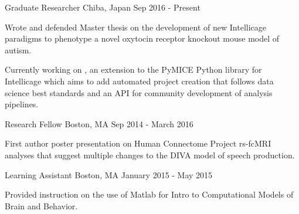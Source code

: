 \vspace*{0.35cm}

\begin{cventries}

    {Graduate Researcher}
    {Chiba, Japan}
    {Sep 2016 - Present}
    {\begin{cvitems}
        \item{
            {Wrote} and 
            {defended} Master thesis on the development of new Intellicage paradigms to
            phenotype a novel oxytocin receptor knockout mouse model of autism.}
        \item{Currently working on , an extension to the
            PyMICE Python library for Intellicage which aims to add automated project
            creation that follows data science best standards and an API for community
            development of analysis pipelines.}
    \end{cvitems}}
    \vspace*{0.2cm}
    
    {Research Fellow}
    {Boston, MA}
    {Sep 2014 - March 2016}
    {\begin{cvitems}
        \item{First author 
            {poster presentation} on Human Connectome Project rs-fcMRI analyses that
            suggest multiple changes to the DIVA model of speech production.}
    \end{cvitems}}
    \vspace*{0.2cm}
    
    {Learning Assistant}
    {Boston, MA}
    {January 2015 - May 2015}
    {\begin{cvitems}
        \item{Provided instruction on the use of Matlab for  Intro to Computational Models of Brain
            and Behavior.}
    \end{cvitems}}
    \vspace*{0.2cm}
    

\end{cventries}

